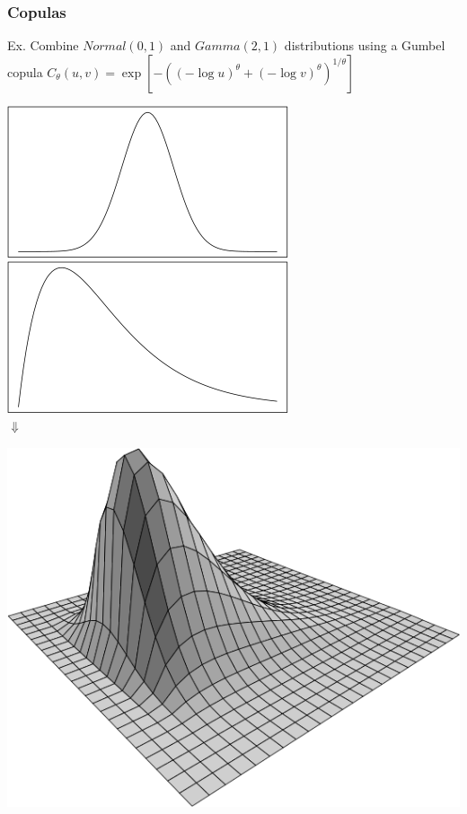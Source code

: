 \documentclass{beamer}
\begin{document}
	\begin{frame}
		\frametitle{Copulas}
		Ex. Combine $Normal(0,1)$ and $Gamma(2,1)$ distributions using a Gumbel copula $C_{\theta}(u,v)=\exp[-( (-\log u)^\theta + (-\log v)^\theta )^{1/\theta}]$	
		\begin{center}
			\includegraphics[scale=0.31]{fig/normal}
			\quad
			\includegraphics[scale=0.31]{fig/gamma}\\
			$\Downarrow$
		\end{center}
		\begin{center}	
			\includegraphics[scale=0.18]{fig/gumbel_cop}
		\end{center}
	\end{frame}
		
\end{document}
